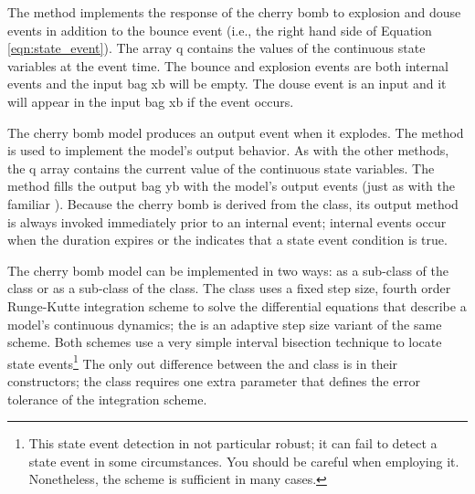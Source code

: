 The  method implements the response of the cherry bomb to explosion and douse events in addition to the bounce event (i.e., the right hand side of Equation \ref{eqn:state_event}). The array q contains the values of the continuous state variables at the event time. The bounce and explosion events are both internal events and the input bag xb will be empty. The douse event is an input and it will appear in the input bag xb if the event occurs. 

The cherry bomb model produces an output event when it explodes. The  method is used to implement the model's output behavior. As with the other methods, the q array contains the current value of the continuous state variables. The method fills the output bag yb with the model's output events (just as with the familiar ). Because the cherry bomb is derived from the  class, its output method is always invoked immediately prior to an internal event; internal events occur when the  duration expires or the  indicates that a state event condition is true.

The cherry bomb model can be implemented in two ways: as a sub-class of the  class or as a sub-class of the  class. The  class uses a fixed step size, fourth order Runge-Kutte integration scheme to solve the differential equations that describe a model's continuous dynamics; the  is an adaptive step size variant of the same scheme. Both schemes use a very simple interval bisection technique to locate state events\footnote{This state event detection in not particular robust; it can fail to detect a state event in some circumstances. You should be careful when employing it. Nonetheless, the scheme is sufficient in many cases.} The only out difference between the  and  class is in their constructors; the  class requires one extra parameter that defines the error tolerance of the integration scheme. 


